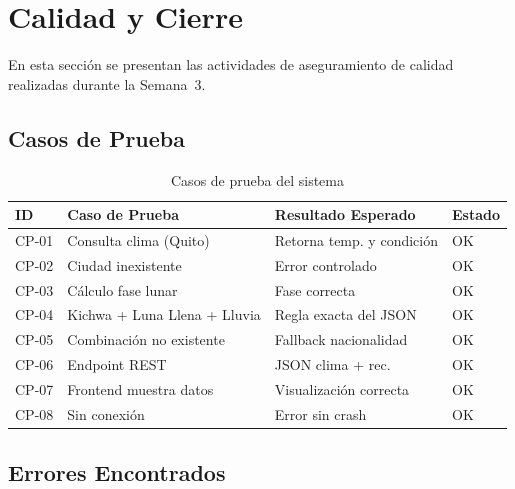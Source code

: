 \documentclass[conference]{IEEEtran}
\begin{document}

\section{Calidad y Cierre}

En esta sección se presentan las actividades de aseguramiento de calidad realizadas durante la Semana~3.

\subsection{Casos de Prueba}

\begin{table}[H]
    \centering
    \caption{Casos de prueba del sistema}
    \label{tab:pruebas}
    \scriptsize
    \begin{tabularx}{\columnwidth}{|l|X|X|l|}
        \hline
        \textbf{ID} & \textbf{Caso de Prueba} & \textbf{Resultado Esperado} & \textbf{Estado} \\
        \hline
        CP-01 & Consulta clima (Quito) & Retorna temp. y condición & OK \\
        \hline
        CP-02 & Ciudad inexistente & Error controlado & OK \\
        \hline
        CP-03 & Cálculo fase lunar & Fase correcta & OK \\
        \hline
        CP-04 & Kichwa + Luna Llena + Lluvia & Regla exacta del JSON & OK \\
        \hline
        CP-05 & Combinación no existente & Fallback nacionalidad & OK \\
        \hline
        CP-06 & Endpoint REST & JSON clima + rec. & OK \\
        \hline
        CP-07 & Frontend muestra datos & Visualización correcta & OK \\
        \hline
        CP-08 & Sin conexión & Error sin crash & OK \\
        \hline
    \end{tabularx}
\end{table}

\subsection{Errores Encontrados}
\end{document}
